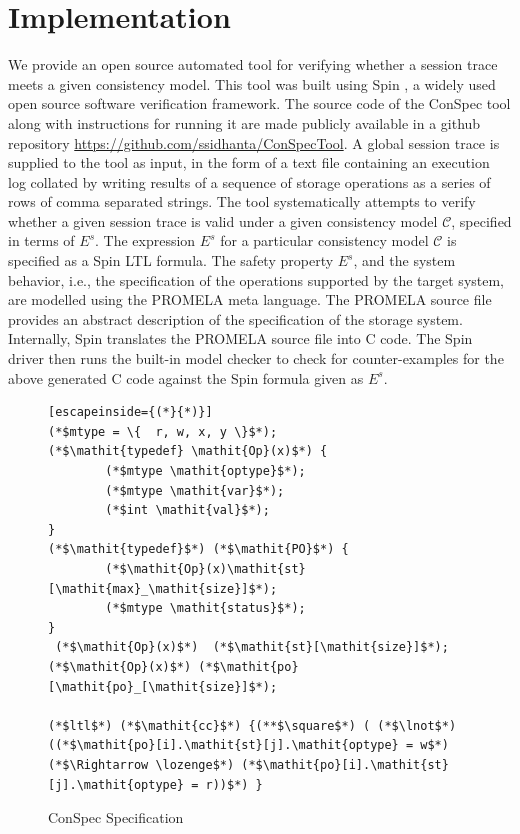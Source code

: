 \documentclass[journal,compsoc]{IEEEtran}
\begin{document}
   \section{Implementation}\label{sec:impl}
 We provide an open source automated  tool for verifying whether a session trace meets a given consistency model. This tool was built using Spin \cite{Holzmann:2003:SMC:1405716}, a widely used \cite{spinroot-success} open source software verification framework. The source code of the ConSpec tool along with instructions for running it are made publicly available in a github repository \url{https://github.com/ssidhanta/ConSpecTool}. A global session trace is supplied to the tool as input, in the form of a text file containing an execution log collated by writing results of a sequence of storage operations as a series of rows of comma separated strings. The tool systematically attempts to  verify whether a given session trace is valid under a given consistency model $\mathcal{C}$, specified in terms of  $E^s$.  The expression  $E^s$ for a particular consistency model $\mathcal{C}$ is specified as a Spin LTL formula. The safety property  $E^s$, and the system behavior, i.e., the specification of the operations supported by the target system, are modelled using the PROMELA meta language. The PROMELA source file provides an abstract description of the specification of the storage system. 
  Internally, Spin translates the PROMELA source file into C code. The Spin driver then runs the built-in model checker to check for counter-examples for the above generated C code  against  the Spin formula given as $E^s$. %
   \begin{figure}\caption{ConSpec Specification}\label{format:spec}
\begin{lstlisting}[escapeinside={(*}{*)}]
(*$mtype = \{  r, w, x, y \}$*);
(*$\mathit{typedef} \mathit{Op}(x)$*) {
		(*$mtype \mathit{optype}$*);
		(*$mtype \mathit{var}$*);
		(*$int \mathit{val}$*);
}
(*$\mathit{typedef}$*) (*$\mathit{PO}$*) {
		(*$\mathit{Op}(x)\mathit{st}[\mathit{max}_\mathit{size}]$*);
		(*$mtype \mathit{status}$*);
}
 (*$\mathit{Op}(x)$*)  (*$\mathit{st}[\mathit{size}]$*);
(*$\mathit{Op}(x)$*) (*$\mathit{po}[\mathit{po}_[\mathit{size}]$*);

(*$ltl$*) (*$\mathit{cc}$*) {(**$\square$*) ( (*$\lnot$*) ((*$\mathit{po}[i].\mathit{st}[j].\mathit{optype} = w$*)(*$\Rightarrow \lozenge$*) (*$\mathit{po}[i].\mathit{st}[j].\mathit{optype} = r))$*) }
\end{lstlisting}
\end{figure}
\end{document}
